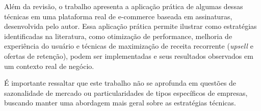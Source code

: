 Além da revisão, o trabalho apresenta a aplicação prática de algumas dessas técnicas em uma plataforma real de e-commerce baseada em assinaturas, desenvolvida pelo autor. Essa aplicação prática permite ilustrar como estratégias identificadas na literatura, como otimização de performance, melhoria de experiência do usuário e técnicas de maximização de receita recorrente (\textit{upsell} e ofertas de retenção), podem ser implementadas e seus resultados observados em um contexto real de negócio.

É importante ressaltar que este trabalho não se aprofunda em questões de sazonalidade de mercado ou particularidades de tipos específicos de empresas, buscando manter uma abordagem mais geral sobre as estratégias técnicas.